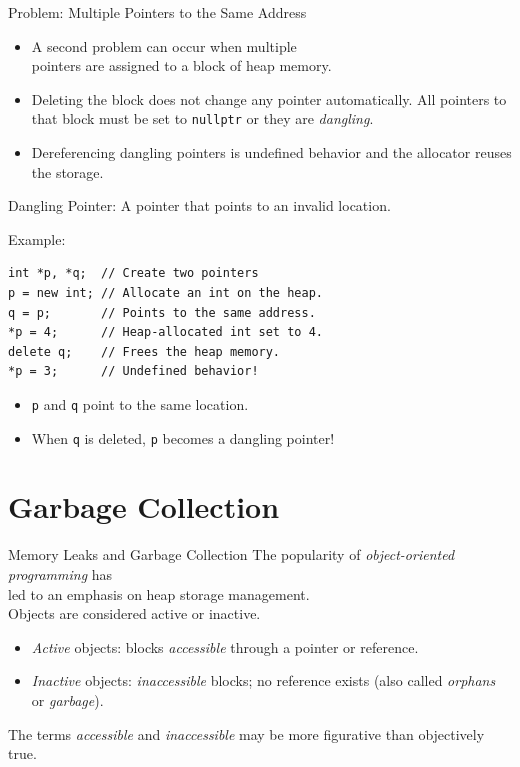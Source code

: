 \documentclass[14pt,aspectratio=1610]{beamer}
\begin{document}
\begin{frame}{Problem: Multiple Pointers to the Same Address}

\begin{itemize}
\item
  A second problem can occur when multiple \\
  pointers are assigned to a block of heap memory.
\item
  Deleting the block does not change any pointer automatically. All
  pointers to that block must be set to \lstinline{nullptr} or they are \emph{dangling}.
\item
  Dereferencing dangling pointers is undefined behavior and
  the allocator reuses the storage.
\end{itemize}
\end{frame}

\begin{frame}[fragile]{Dangling Pointer: A pointer that points to an invalid location.}

Example:

\begin{lstlisting}
int *p, *q;  // Create two pointers
p = new int; // Allocate an int on the heap.
q = p;       // Points to the same address.
*p = 4;      // Heap-allocated int set to 4.
delete q;    // Frees the heap memory.
*p = 3;      // Undefined behavior!
\end{lstlisting}

\begin{itemize}
\item
  \lstinline{p} and \lstinline{q} point to the same location.
\item
  When \lstinline{q} is deleted, \lstinline{p} becomes a dangling pointer!
\end{itemize}
\end{frame}

\section{Garbage Collection}
\begin{frame}{Memory Leaks and Garbage Collection}
  The popularity of \textit{object-oriented programming} has \\ led to an
  emphasis on heap storage management.\\[1em]

  Objects are considered active or inactive.
  \begin{itemize}
  \item
    \emph{Active} objects: blocks \textit{accessible} through a pointer or reference.
  \item
    \emph{Inactive} objects: \textit{inaccessible} blocks; no reference exists (also called \emph{orphans} or \emph{garbage}).
  \end{itemize}

  The terms \textit{accessible} and \textit{inaccessible} may be more figurative than objectively true.
\end{frame}
\end{document}
